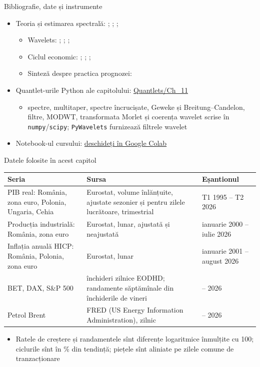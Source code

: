 \begin{frame}{Bibliografie, date și instrumente}
\itemsize{\small}
\begin{itemize}
    \item Teoria și estimarea spectrală: ; ; ; 
    \begin{itemize}
        \item Wavelets: ; ; ; 
        \item Ciclul economic: ; ; ; 
        \item Sinteză despre practica prognozei: 
    \end{itemize}
    \item Quantlet-urile Python ale capitolului: \href{https://github.com/danpele/Advanced-Time-Series/tree/main/Quantlets/Ch_11}{Quantlets/Ch\_11}
    \begin{itemize}
        \item spectre, multitaper, spectre încrucișate, Geweke și Breitung--Candelon, filtre, MODWT, transformata Morlet și coerența wavelet scrise în \texttt{numpy}/\texttt{scipy}; \texttt{PyWavelets} furnizează filtrele wavelet
    \end{itemize}
    \item Notebook-ul cursului: \href{\colaburl{notebooks/EN/chapter11_lecture_notebook.ipynb}}{deschideți în Google Colab}
\end{itemize}
\end{frame}

\begin{frame}{Datele folosite în acest capitol}
\itemsize{\footnotesize}
\begin{center}
\scriptsize
\begin{tabular}{>{\raggedright\arraybackslash}p{3.6cm}>{\raggedright\arraybackslash}p{5.0cm}>{\raggedright\arraybackslash}p{3.4cm}}
\toprule
\textbf{Seria} & \textbf{Sursa} & \textbf{Eșantionul} \\
\midrule
PIB real: România, zona euro, Polonia, Ungaria, Cehia & Eurostat, volume înlănțuite, ajustate sezonier și pentru zilele lucrătoare, trimestrial & T1 1995 -- T2 2026 \\
Producția industrială: România, zona euro & Eurostat, lunar, ajustată și neajustată & ianuarie 2000 -- iulie 2026 \\
Inflația anuală HICP: România, Polonia, zona euro & Eurostat, lunar & ianuarie 2001 -- august 2026 \\
BET, DAX, S\&P 500 & închideri zilnice EODHD; randamente săptămînale din închiderile de vineri & 2000 -- 2026 \\
Petrol Brent & FRED (US Energy Information Administration), zilnic & 2000 -- 2026 \\
\bottomrule
\end{tabular}
\end{center}
\begin{itemize}
    \item Ratele de creștere și randamentele sînt diferențe logaritmice înmulțite cu 100; ciclurile sînt în \% din tendință; piețele sînt aliniate pe zilele comune de tranzacționare
\end{itemize}
\end{frame}

